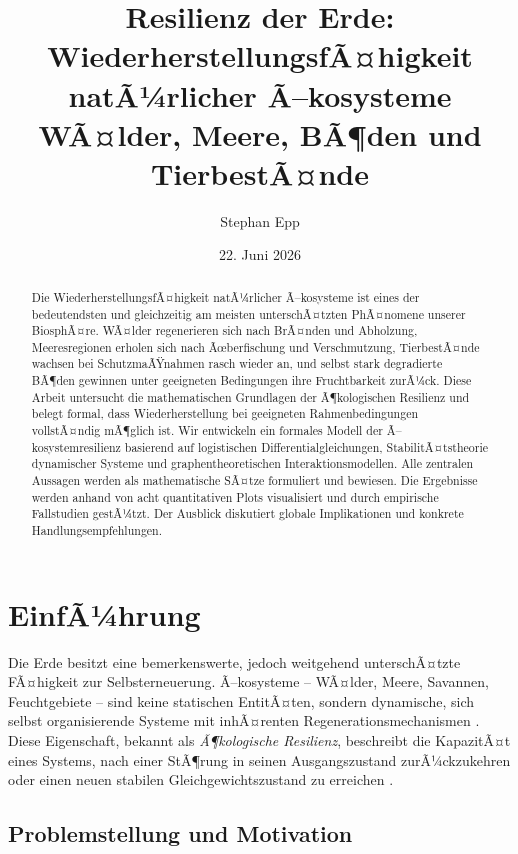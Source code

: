 ﻿\documentclass[a4paper,12pt]{article}
\title{Resilienz der Erde:\\
WiederherstellungsfÃ¤higkeit natÃ¼rlicher Ã–kosysteme\\\large
WÃ¤lder, Meere, BÃ¶den und TierbestÃ¤nde}
\author{Stephan Epp}
\date{22. Juni 2026}
\theoremstyle{definition}
\begin{document}
	
\maketitle

\begin{abstract}
Die WiederherstellungsfÃ¤higkeit natÃ¼rlicher Ã–kosysteme ist eines der bedeutendsten und gleichzeitig am meisten unterschÃ¤tzten PhÃ¤nomene unserer BiosphÃ¤re. WÃ¤lder regenerieren sich nach BrÃ¤nden und Abholzung, Meeresregionen erholen sich nach Ãœberfischung und Verschmutzung, TierbestÃ¤nde wachsen bei SchutzmaÃŸnahmen rasch wieder an, und selbst stark degradierte BÃ¶den gewinnen unter geeigneten Bedingungen ihre Fruchtbarkeit zurÃ¼ck. Diese Arbeit untersucht die mathematischen Grundlagen der Ã¶kologischen Resilienz und belegt formal, dass Wiederherstellung bei geeigneten Rahmenbedingungen vollstÃ¤ndig mÃ¶glich ist. Wir entwickeln ein formales Modell der Ã–kosystemresilienz basierend auf logistischen Differentialgleichungen, StabilitÃ¤tstheorie dynamischer Systeme und graphentheoretischen Interaktionsmodellen. Alle zentralen Aussagen werden als mathematische SÃ¤tze formuliert und bewiesen. Die Ergebnisse werden anhand von acht quantitativen Plots visualisiert und durch empirische Fallstudien gestÃ¼tzt. Der Ausblick diskutiert globale Implikationen und konkrete Handlungsempfehlungen.
\end{abstract}

\tableofcontents
\newpage

\section{EinfÃ¼hrung}

Die Erde besitzt eine bemerkenswerte, jedoch weitgehend unterschÃ¤tzte FÃ¤higkeit zur Selbsterneuerung. Ã–kosysteme -- WÃ¤lder, Meere, Savannen, Feuchtgebiete -- sind keine statischen EntitÃ¤ten, sondern dynamische, sich selbst organisierende Systeme mit inhÃ¤renten Regenerationsmechanismen \cite{holling1973resilience}. Diese Eigenschaft, bekannt als \emph{Ã¶kologische Resilienz}, beschreibt die KapazitÃ¤t eines Systems, nach einer StÃ¶rung in seinen Ausgangszustand zurÃ¼ckzukehren oder einen neuen stabilen Gleichgewichtszustand zu erreichen \cite{walker2004resilience}.

\subsection{Problemstellung und Motivation}
\end{document}
